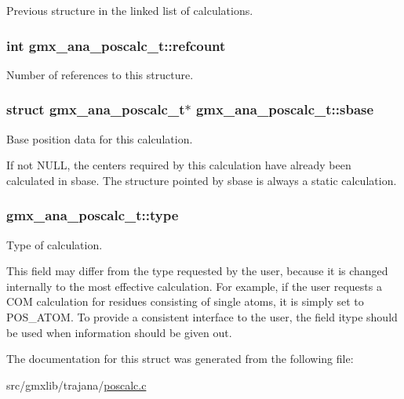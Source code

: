 \-Previous structure in the linked list of calculations. \hypertarget{structgmx__ana__poscalc__t_a3b4ef518ccc2a2d73f4b6ec7c51ac4c8}{
\subsubsection[{refcount}]{\setlength{\rightskip}{0pt plus 5cm}int {\bf gmx\-\_\-ana\-\_\-poscalc\-\_\-t\-::refcount}}}\label{structgmx__ana__poscalc__t_a3b4ef518ccc2a2d73f4b6ec7c51ac4c8}
\-Number of references to this structure. \hypertarget{structgmx__ana__poscalc__t_a8b9a27a793b47d53dfa203da5c01c546}{
\subsubsection[{sbase}]{\setlength{\rightskip}{0pt plus 5cm}struct {\bf gmx\-\_\-ana\-\_\-poscalc\-\_\-t}$\ast$ {\bf gmx\-\_\-ana\-\_\-poscalc\-\_\-t\-::sbase}}}\label{structgmx__ana__poscalc__t_a8b9a27a793b47d53dfa203da5c01c546}


\-Base position data for this calculation. 

\-If not \-N\-U\-L\-L, the centers required by this calculation have already been calculated in {\ttfamily sbase}. \-The structure pointed by {\ttfamily sbase} is always a static calculation. \hypertarget{structgmx__ana__poscalc__t_ad361499da3e273c1f4ef1eed185389e5}{
\subsubsection[{type}]{ {\bf gmx\-\_\-ana\-\_\-poscalc\-\_\-t\-::type}}}\label{structgmx__ana__poscalc__t_ad361499da3e273c1f4ef1eed185389e5}


\-Type of calculation. 

\-This field may differ from the type requested by the user, because it is changed internally to the most effective calculation. \-For example, if the user requests a \-C\-O\-M calculation for residues consisting of single atoms, it is simply set to \-P\-O\-S\-\_\-\-A\-T\-O\-M. \-To provide a consistent interface to the user, the field {\ttfamily itype} should be used when information should be given out. 

\-The documentation for this struct was generated from the following file\-:\begin{DoxyCompactItemize}
\item 
src/gmxlib/trajana/\hyperlink{poscalc_8c}{poscalc.\-c}\end{DoxyCompactItemize}
